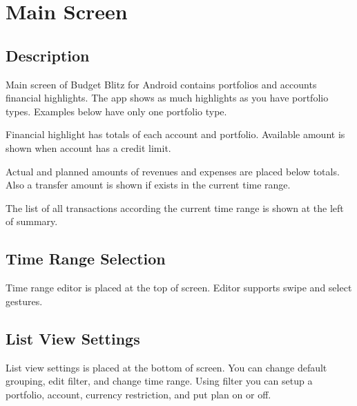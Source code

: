 \documentclass[a4paper,10pt,english]{sphinxmanual}
\begin{document}
\sphinxstepscope


\chapter{Main Screen}
\label{\detokenize{main-screen:main-screen}}\label{\detokenize{main-screen:chapter-main-screen}}\label{\detokenize{main-screen::doc}}

\section{Description}
\label{\detokenize{main-screen:description}}
\sphinxAtStartPar
Main screen of Budget Blitz for Android contains portfolios and accounts financial highlights. The app shows
as much highlights as you have portfolio types. Examples below have only one  portfolio type.

\sphinxAtStartPar
Financial highlight has totals of each account and portfolio. Available amount is shown when account
has a credit limit.

\sphinxAtStartPar
Actual and planned amounts of revenues and expenses are placed below totals. Also a transfer amount is shown
if exists in the current time range.

\noindent{}
\noindent{}
\noindent{}

\sphinxAtStartPar
The list of all transactions according the current time range is shown at the left of summary.


\section{Time Range Selection}
\label{\detokenize{main-screen:time-range-selection}}
\sphinxAtStartPar
Time range editor is placed at the top of screen. Editor supports swipe and select gestures.

\noindent{}
\noindent{}
\noindent{}


\section{List View Settings}
\label{\detokenize{main-screen:list-view-settings}}
\sphinxAtStartPar
List view settings is placed at the bottom of screen. You can change default grouping,
edit filter, and change time range. Using filter you can setup a portfolio, account,
currency restriction, and put plan on or off.
\end{document}
